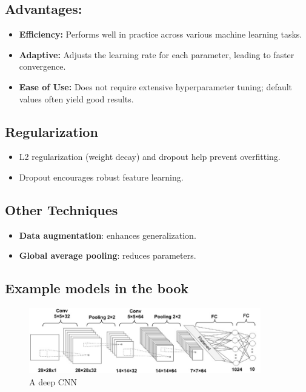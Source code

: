 \subsection*{Advantages:}
\begin{itemize}
    \item \textbf{Efficiency:} Performs well in practice across various machine learning tasks.
    \item \textbf{Adaptive:} Adjusts the learning rate for each parameter, leading to faster convergence.
    \item \textbf{Ease of Use:} Does not require extensive hyperparameter tuning; default values often yield good results.
\end{itemize}

\subsection{Regularization}
\begin{itemize}
    \item L2 regularization (weight decay) and dropout help prevent overfitting.
    \item Dropout encourages robust feature learning.
\end{itemize}

\subsection{Other Techniques}
\begin{itemize}
    \item \textbf{Data augmentation}: enhances generalization.
    \item \textbf{Global average pooling}: reduces parameters.
\end{itemize}

\subsection{Example models in the book}
\begin{figure}[!h]
    \centering
    \includegraphics[width=0.9\textwidth]{../figures/deepCNN.jpg}
    \caption{A deep CNN}
\end{figure}
